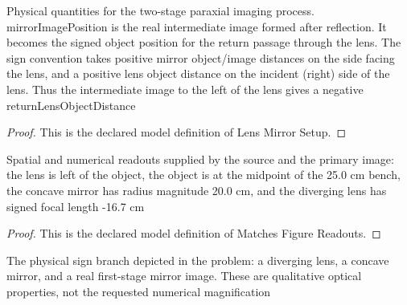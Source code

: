 \begin{definition}
  \label{def:physics:phyx-mini-0032:phyxminiproblems-problemphyxmini0032-lensmirrorsetup}
  Physical quantities for the two-stage paraxial imaging process. mirrorImagePosition is the real intermediate image formed after reflection. It becomes the signed object position for the return passage through the lens. The sign convention takes positive mirror object/image distances on the side facing the lens, and a positive lens object distance on the incident (right) side of the lens. Thus the intermediate image to the left of the lens gives a negative returnLensObjectDistance
\end{definition}
\begin{proof}
  This is the declared model definition of Lens Mirror Setup.
\end{proof}
\begin{definition}
  \label{def:physics:phyx-mini-0032:phyxminiproblems-problemphyxmini0032-matchesfigurereadouts}
  Spatial and numerical readouts supplied by the source and the primary image: the lens is left of the object, the object is at the midpoint of the 25.0 cm bench, the concave mirror has radius magnitude 20.0 cm, and the diverging lens has signed focal length -16.7 cm
\end{definition}
\begin{proof}
  This is the declared model definition of Matches Figure Readouts.
\end{proof}
\begin{definition}
  \label{def:physics:phyx-mini-0032:phyxminiproblems-problemphyxmini0032-hasdepictedopticaltypes}
  The physical sign branch depicted in the problem: a diverging lens, a concave mirror, and a real first-stage mirror image. These are qualitative optical properties, not the requested numerical magnification
\end{definition}
